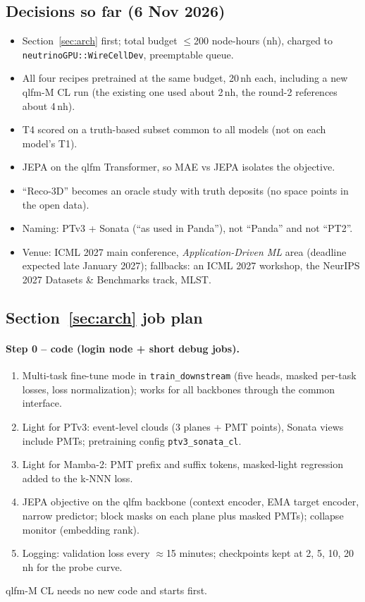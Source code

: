 \documentclass[11pt,a4paper]{article}
\newcommand{\code}[1]{\texttt{\small #1}}
\begin{document}
\subsection{Decisions so far (6 Nov 2026)}
\begin{itemize}
  \item Section~\ref{sec:arch} first; total budget $\leq$200 node-hours (nh), charged to \code{neutrinoGPU::WireCellDev}, preemptable queue.
  \item All four recipes pretrained at the same budget, 20\,nh each, including a new qlfm-M CL run (the existing one used about 2\,nh, the round-2 references about 4\,nh).
  \item T4 scored on a truth-based subset common to all models (not on each model's T1).
  \item JEPA on the qlfm Transformer, so MAE vs JEPA isolates the objective.
  \item ``Reco-3D'' becomes an oracle study with truth deposits (no space points in the open data).
  \item Naming: PTv3 + Sonata (``as used in Panda''), not ``Panda'' and not ``PT2''.
  \item Venue: ICML 2027 main conference, \emph{Application-Driven ML} area (deadline expected late January 2027); fallbacks: an ICML 2027 workshop, the NeurIPS 2027 Datasets \& Benchmarks track, MLST.
\end{itemize}

\subsection{Section~\ref{sec:arch} job plan}
\paragraph{Step 0 -- code (login node + short debug jobs).}
\begin{enumerate}
  \item Multi-task fine-tune mode in \code{train\_downstream} (five heads, masked per-task losses, loss normalization); works for all backbones through the common interface.
  \item Light for PTv3: event-level clouds (3 planes + PMT points), Sonata views include PMTs; pretraining config \code{ptv3\_sonata\_cl}.
  \item Light for Mamba-2: PMT prefix and suffix tokens, masked-light regression added to the k-NNN loss.
  \item JEPA objective on the qlfm backbone (context encoder, EMA target encoder, narrow predictor; block masks on each plane plus masked PMTs); collapse monitor (embedding rank).
  \item Logging: validation loss every $\approx$15 minutes; checkpoints kept at 2, 5, 10, 20\,nh for the probe curve.
\end{enumerate}
qlfm-M CL needs no new code and starts first.
\end{document}
